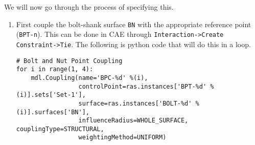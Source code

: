\documentclass[11pt]{article}
\begin{document}
We will now go through the process of specifying this.
\begin{enumerate}
\item First couple the bolt-shank surface \texttt{BN} with the appropriate reference point (\texttt{BPT-n}).
This can be done in CAE through \texttt{Interaction->Create Constraint->Tie}.
The following is python code that will do this in a loop.
\begin{verbatim}
# Bolt and Nut Point Coupling
for i in range(1, 4):
    mdl.Coupling(name='BPC-%d' %(i),
                 controlPoint=ras.instances['BPT-%d' %(i)].sets['Set-1'],
                 surface=ras.instances['BOLT-%d' %(i)].surfaces['BN'],
                 influenceRadius=WHOLE_SURFACE, couplingType=STRUCTURAL,
                 weightingMethod=UNIFORM)


\end{verbatim}
\end{enumerate}
\end{document}
